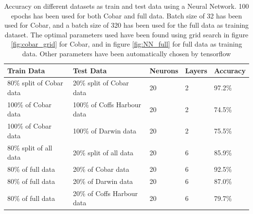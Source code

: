 \documentclass[11pt]{article}
\begin{document}
\begin{table}[H]
    \caption{Accuracy on different datasets as train and test data using a Neural Network. 100 epochs has been used for both Cobar and full data. Batch size of 32 has been used for Cobar, and a batch size of 320 has been used for the full data as training dataset.  The optimal parameters used have been found using grid search in figure \ref{fig:cobar_grid} for Cobar, and in figure \ref{fig:NN_full} for full data as training data. Other parameters have been automatically chosen by tensorflow}
    \label{tab:grid_NN}
    \centering
    \begin{tabular}{|l|l|l|l|l|}
        \hline
        \textbf{Train Data}      & \textbf{Test Data}          & \textbf{Neurons} & \textbf{Layers} & \textbf{Accuracy} \\
        \hline
        80\% split of Cobar data & 20\% split of Cobar data    & 20               & 2               & 97.2\%            \\
        \hline
        100\% of Cobar data      & 100\% of Coffs Harbour data & 20               & 2               & 74.5\%            \\
        \hline
        100\% of Cobar data      & 100\% of Darwin data        & 20               & 2               & 75.5\%            \\
        \hline
        80\% split of all data   & 20\% split of all data      & 20               & 6               & 85.9\%            \\
        \hline
        80\% of full data        & 20\% of Cobar data          & 20               & 6               & 92.5\%            \\
        \hline
        80\% of full data        & 20\% of Darwin data         & 20               & 6               & 87.0\%            \\
        \hline
        80\% of full data        & 20\% of Coffs Harbour data  & 20               & 6               & 79.7\%            \\
        \hline
    \end{tabular}
\end{table}
\end{document}
